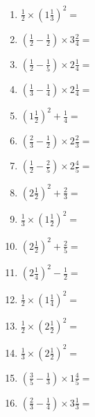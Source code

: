 \documentclass[12pt]{article}
\begin{document}
\begin{enumerate}
\item \large $ \frac{1}{2} \times \left( 1 \frac{1}{3} \right)^2 = $ \vspace{1.6cm}
\item \large $ \left( \frac{1}{2} - \frac{1}{2} \right) \times 3 \frac{2}{4} = $ \vspace{1.6cm}
\item \large $ \left( \frac{1}{2} - \frac{1}{5} \right) \times 2 \frac{1}{4} = $ \vspace{1.6cm}
\item \large $ \left( \frac{1}{3} - \frac{1}{4} \right) \times 2 \frac{1}{4} = $ \vspace{1.6cm}
\item \large $ \left( 1 \frac{1}{2} \right)^2 + \frac{1}{4} = $ \vspace{1.6cm}
\item \large $ \left( \frac{2}{3} - \frac{1}{2} \right) \times 2 \frac{2}{3} = $ \vspace{1.6cm}
\newpage
\item \large $ \left( \frac{1}{2} - \frac{2}{5} \right) \times 2 \frac{4}{5} = $ \vspace{1.6cm}
\item \large $ \left( 2 \frac{1}{2} \right)^2 + \frac{2}{3} = $ \vspace{1.6cm}
\item \large $ \frac{1}{3} \times \left( 1 \frac{1}{2} \right)^2 = $ \vspace{1.6cm}
\item \large $ \left( 2 \frac{1}{2} \right)^2 + \frac{2}{5} = $ \vspace{1.6cm}
\item \large $ \left( 2 \frac{1}{4} \right)^2 - \frac{1}{2} = $ \vspace{1.6cm}
\item \large $ \frac{1}{2} \times \left( 1 \frac{1}{4} \right)^2 = $ \vspace{1.6cm}
\item \large $ \frac{1}{2} \times \left( 2 \frac{1}{2} \right)^2 = $ \vspace{1.6cm}
\item \large $ \frac{1}{3} \times \left( 2 \frac{1}{2} \right)^2 = $ \vspace{1.6cm}
\item \large $ \left( \frac{3}{5} - \frac{1}{3} \right) \times 1 \frac{4}{5} = $ \vspace{1.6cm}
\item \large $ \left( \frac{2}{3} - \frac{1}{4} \right) \times 3 \frac{1}{3} = $ \vspace{1.6cm}

\end{enumerate}
\end{document}
